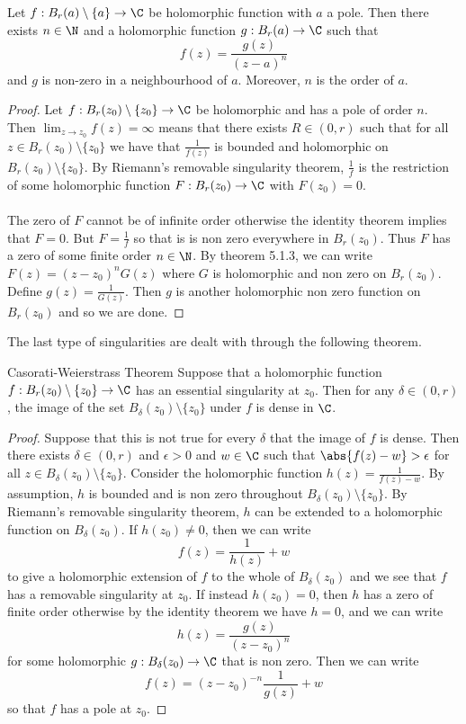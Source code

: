 \documentclass[a4paper]{article}
\begin{document}
\begin{prp}{}{} Let $f:B_r(a)\setminus\{a\}\to\C$ be holomorphic function with $a$ a pole. Then there exists $n\in\N$ and a holomorphic function $g:B_r(a)\to\C$ such that $$f(z)=\frac{g(z)}{(z-a)^n}$$ and $g$ is non-zero in a neighbourhood of $a$. Moreover, $n$ is the order of $a$. \tcbline
\begin{proof}
Let $f:B_r(z_0)\setminus\{z_0\}\to\C$ be holomorphic and has a pole of order $n$. Then $\lim_{z\to z_0}f(z)=\infty$ means that there exists $R\in(0,r)$ such that for all $z\in B_r(z_0)\setminus\{z_0\}$ we have that $\frac{1}{f(z)}$ is bounded and holomorphic on $B_r(z_0)\setminus\{z_0\}$. By Riemann's removable singularity theorem, $\frac{1}{f}$ is the restriction of some holomorphic function $F:B_r(z_0)\to\C$ with $F(z_0)=0$. \\~\\

The zero of $F$ cannot be of infinite order otherwise the identity theorem implies that $F=0$. But $F=\frac{1}{f}$ so that is is non zero everywhere in $B_r(z_0)$. Thus $F$ has a zero of some finite order $n\in\N$. By theorem 5.1.3, we can write $F(z)=(z-z_0)^nG(z)$ where $G$ is holomorphic and non zero on $B_r(z_0)$. Define $g(z)=\frac{1}{G(z)}$. Then $g$ is another holomorphic non zero function on $B_r(z_0)$ and so we are done. 
\end{proof}
\end{prp}

The last type of singularities are dealt with through the following theorem. 

\begin{thm}{Casorati-Weierstrass Theorem}{} Suppose that a holomorphic function $f:B_r(z_0)\setminus\{z_0\}\to\C$ has an essential singularity at $z_0$. Then for any $\delta\in(0,r)$, the image of the set $B_\delta(z_0)\setminus\{z_0\}$ under $f$ is dense in $\C$. \tcbline
\begin{proof}
Suppose that this is not true for every $\delta$ that the image of $f$ is dense. Then there exists $\delta\in(0,r)$ and $\epsilon>0$ and $w\in\C$ such that $\abs{f(z)-w}>\epsilon$ for all $z\in B_\delta(z_0)\setminus\{z_0\}$. Consider the holomorphic function $h(z)=\frac{1}{f(z)-w}$. By assumption, $h$ is bounded and is non zero throughout $B_\delta(z_0)\setminus\{z_0\}$. By Riemann's removable singularity theorem, $h$ can be extended to a holomorphic function on $B_\delta(z_0)$. If $h(z_0)\neq 0$, then we can write $$f(z)=\frac{1}{h(z)}+w$$ to give a holomorphic extension of $f$ to the whole of $B_\delta(z_0)$ and we see that $f$ has a removable singularity at $z_0$. If instead $h(z_0)=0$, then $h$ has a zero of finite order otherwise by the identity theorem we have $h=0$, and we can write $$h(z)=\frac{g(z)}{(z-z_0)^n}$$ for some holomorphic $g:B_\delta(z_0)\to\C$ that is non zero. Then we can write $$f(z)=(z-z_0)^{-n}\frac{1}{g(z)}+w$$ so that $f$ has a pole at $z_0$. 
\end{proof}
\end{thm}
\end{document}
